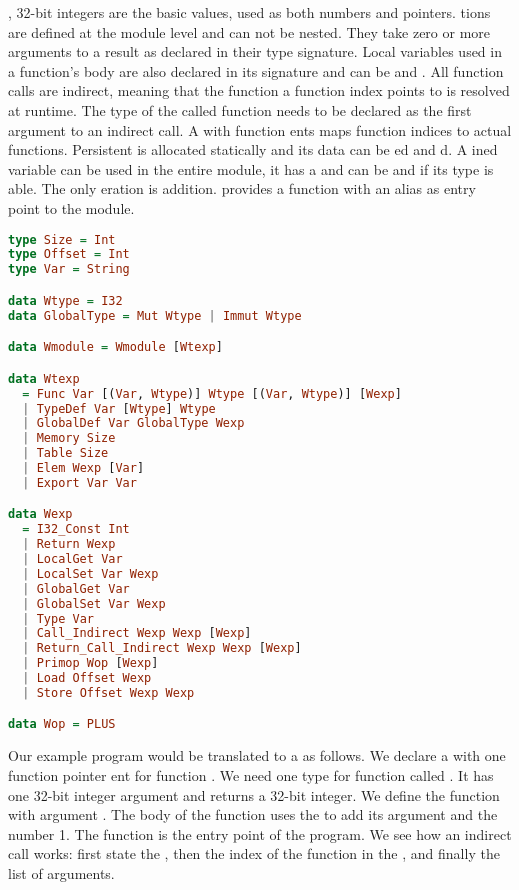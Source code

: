 {, 32-bit integers are the basic values, used as both numbers and pointers. tions are defined at the module level and can not be nested. They take zero or more arguments to a result as declared in their type signature. Local variables used in a function's body are also declared in its signature and can be  and . All function calls are indirect, meaning that the function a function index points to is resolved at runtime. The type of the called function needs to be declared as the first argument to an indirect call. A  with function ents maps function indices to actual functions. Persistent  is allocated statically and its data can be ed and d. A ined variable can be used in the entire module, it has a  and can be  and  if its type is able. The only eration is addition.  provides a function with an alias as entry point to the module.

\begin{lstlisting}[language=Haskell]
type Size = Int
type Offset = Int
type Var = String

data Wtype = I32
data GlobalType = Mut Wtype | Immut Wtype

data Wmodule = Wmodule [Wtexp]

data Wtexp
  = Func Var [(Var, Wtype)] Wtype [(Var, Wtype)] [Wexp]
  | TypeDef Var [Wtype] Wtype
  | GlobalDef Var GlobalType Wexp
  | Memory Size
  | Table Size
  | Elem Wexp [Var]
  | Export Var Var

data Wexp
  = I32_Const Int
  | Return Wexp
  | LocalGet Var
  | LocalSet Var Wexp
  | GlobalGet Var
  | GlobalSet Var Wexp
  | Type Var
  | Call_Indirect Wexp Wexp [Wexp]
  | Return_Call_Indirect Wexp Wexp [Wexp]
  | Primop Wop [Wexp]
  | Load Offset Wexp
  | Store Offset Wexp Wexp

data Wop = PLUS
\end{lstlisting}

Our example program  would be translated to a  as follows. We declare a  with one function pointer ent for function . We need one type for function  called . It has one 32-bit integer argument and returns a 32-bit integer. We define the function  with argument . The body of the function uses the   to add its argument and the number 1. The function  is the entry point of the program. We see how an indirect call works: first state the , then the index of the function in the , and finally the list of arguments.

}
